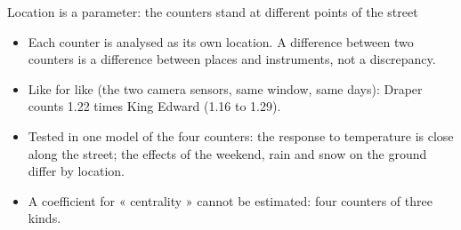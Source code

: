 \documentclass[aspectratio=169,10pt]{beamer}\usetheme{default}\usecolortheme{seahorse}\setbeamertemplate{navigation symbols}{}\setbeamertemplate{footline}[frame number]
\begin{document}
\begin{frame}{Location is a parameter: the counters stand at different points of the street}
\begin{center}\end{center}
\begin{itemize}
\item Each counter is analysed as its own location. A difference between two counters is a difference between places and instruments, not a discrepancy.
\item Like for like (the two camera sensors, same window, same days): Draper counts 1.22 times King Edward (1.16 to 1.29).
\item Tested in one model of the four counters: the response to temperature is close along the street; the effects of the weekend, rain and snow on the ground differ by location.
\item A coefficient for « centrality » cannot be estimated: four counters of three kinds.
\end{itemize}
\end{frame}
\end{document}
